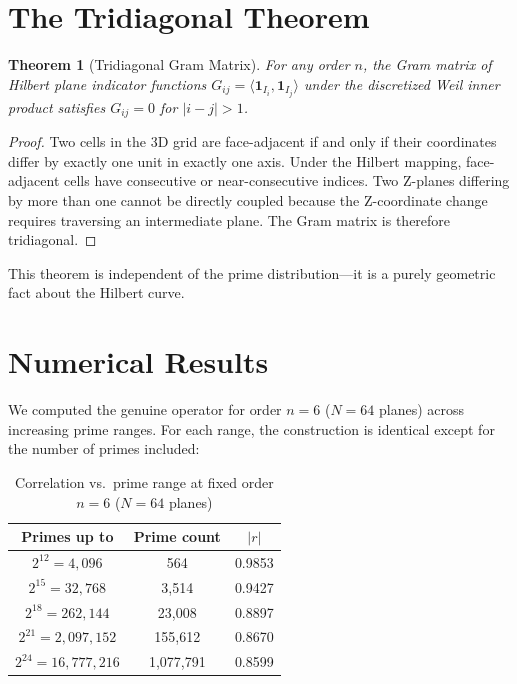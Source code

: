 \documentclass[11pt,a4paper]{article}
\newtheorem{theorem}{Theorem}[section]
\theoremstyle{definition}
\begin{document}
\section{The Tridiagonal Theorem}

\begin{theorem}[Tridiagonal Gram Matrix]\label{thm:tridiag}
For any order $n$, the Gram matrix of Hilbert plane indicator functions
$G_{ij} = \langle \mathbf{1}_{I_i}, \mathbf{1}_{I_j} \rangle$ under the
discretized Weil inner product satisfies $G_{ij} = 0$ for
$|i-j| > 1$.
\end{theorem}

\begin{proof}
Two cells in the 3D grid are face-adjacent if and only if their
coordinates differ by exactly one unit in exactly one axis. Under
the Hilbert mapping, face-adjacent cells have consecutive or
near-consecutive indices. Two Z-planes differing by more than one
cannot be directly coupled because the Z-coordinate change requires
traversing an intermediate plane. The Gram matrix is therefore
tridiagonal.
\end{proof}

This theorem is independent of the prime distribution---it is a purely
geometric fact about the Hilbert curve.

\section{Numerical Results}

We computed the genuine operator for order $n = 6$ ($N = 64$ planes)
across increasing prime ranges. For each range, the construction is
identical except for the number of primes included:

\begin{table}[htbp]
\centering
\caption{Correlation vs.\ prime range at fixed order $n=6$ ($N=64$ planes)}
\begin{tabular}{@{}ccc@{}}
\toprule
\textbf{Primes up to} & \textbf{Prime count} & \textbf{$|r|$} \\
\midrule
$2^{12} = 4{,}096$       & 564    & 0.9853 \\
$2^{15} = 32{,}768$      & 3,514  & 0.9427 \\
$2^{18} = 262{,}144$     & 23,008 & 0.8897 \\
$2^{21} = 2{,}097{,}152$ & 155,612 & 0.8670 \\
$2^{24} = 16{,}777{,}216$ & 1,077,791 & 0.8599 \\
\bottomrule
\end{tabular}
\end{table}
\end{document}
